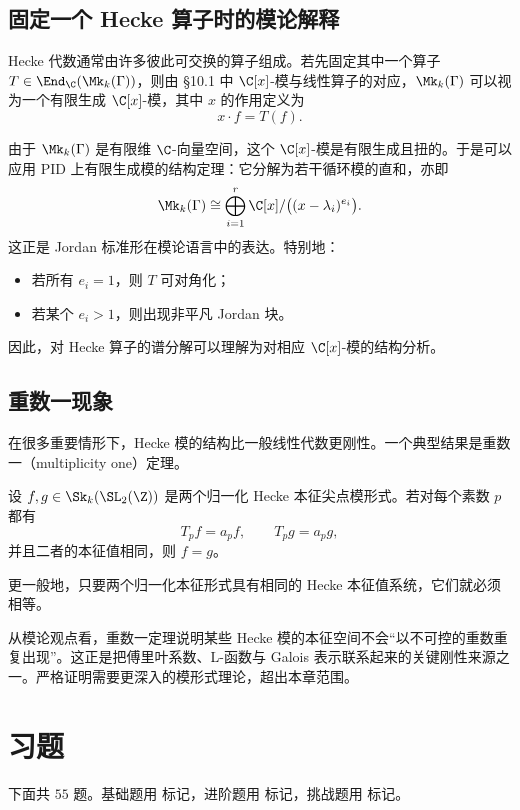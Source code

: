 \subsection{固定一个 Hecke 算子时的模论解释}

Hecke 代数通常由许多彼此可交换的算子组成。若先固定其中一个算子 $T\in \End_\C(\Mk_k(\Gamma))$，则由 \S10.1 中 $\C[x]$-模与线性算子的对应，$\Mk_k(\Gamma)$ 可以视为一个有限生成 $\C[x]$-模，其中 $x$ 的作用定义为
\[
x\cdot f=T(f).
\]

由于 $\Mk_k(\Gamma)$ 是有限维 $\C$-向量空间，这个 $\C[x]$-模是有限生成且扭的。于是可以应用 PID 上有限生成模的结构定理：它分解为若干循环模的直和，亦即
\[
\Mk_k(\Gamma)\cong \bigoplus_{i=1}^r \C[x]/\bigl((x-\lambda_i)^{e_i}\bigr).
\]
这正是 Jordan 标准形在模论语言中的表达。特别地：
\begin{itemize}
  \item 若所有 $e_i=1$，则 $T$ 可对角化；
  \item 若某个 $e_i>1$，则出现非平凡 Jordan 块。
\end{itemize}

因此，对 Hecke 算子的谱分解可以理解为对相应 $\C[x]$-模的结构分析。

\subsection{重数一现象}

在很多重要情形下，Hecke 模的结构比一般线性代数更刚性。一个典型结果是重数一（multiplicity one）定理。

\begin{theorem}
设 $f,g\in \Sk_k(\SL_2(\Z))$ 是两个归一化 Hecke 本征尖点模形式。若对每个素数 $p$ 都有
\[
T_pf=a_pf,\qquad T_pg=a_pg,
\]
并且二者的本征值相同，则 $f=g$。

更一般地，只要两个归一化本征形式具有相同的 Hecke 本征值系统，它们就必须相等。
\end{theorem}

\begin{remark}
从模论观点看，重数一定理说明某些 Hecke 模的本征空间不会“以不可控的重数重复出现”。这正是把傅里叶系数、L-函数与 Galois 表示联系起来的关键刚性来源之一。严格证明需要更深入的模形式理论，超出本章范围。
\end{remark}

\section*{习题}

下面共 $55$ 题。基础题用 \basic{} 标记，进阶题用 \medium{} 标记，挑战题用 \hard{} 标记。

